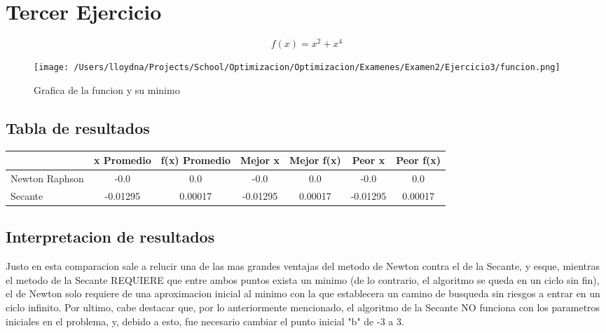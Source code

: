 \documentclass{report}
\begin{document}
        \section{Tercer Ejercicio}
            \begin{equation*}
                f(x)=x^2+x^4
            \end{equation*}

            \begin{figure}[H]
                \texttt{[image: /Users/lloydna/Projects/School/Optimizacion/Optimizacion/Examenes/Examen2/Ejercicio3/funcion.png]}
                \caption{Grafica de la funcion y su minimo}
                \label{fig:fun13}
            \end{figure}

            \subsection{Tabla de resultados}
                \begin{tabular}{l|c|c|c|c|c|c}
                    & x Promedio & f(x) Promedio & Mejor x & Mejor f(x) & Peor x & Peor f(x)\\
                    \hline
                    Newton Raphson & -0.0 & 0.0 & -0.0 & 0.0 & -0.0 & 0.0\\
                    \hline
                    Secante & -0.01295 & 0.00017 & -0.01295 & 0.00017 & -0.01295 & 0.00017\\
                    \hline
                \end{tabular}
            
            \subsection{Interpretacion de resultados}
                Justo en esta comparacion sale a relucir una de las mas grandes ventajas del metodo de
                Newton contra el de la Secante, y esque, mientras el metodo de la Secante REQUIERE que
                entre ambos puntos exista un minimo (de lo contrario, el algoritmo se queda en un ciclo sin fin),
                el de Newton solo requiere de una aproximacion inicial al minimo con la que establecera un camino
                de busqueda sin riesgos a entrar en un ciclo infinito.
                Por ultimo, cabe destacar que, por lo anteriormente mencionado, el algoritmo de la Secante NO funciona
                con los parametros iniciales en el problema, y, debido a esto, fue necesario cambiar el punto inicial "b"
                de -3 a 3.
        \pagebreak
\end{document}

